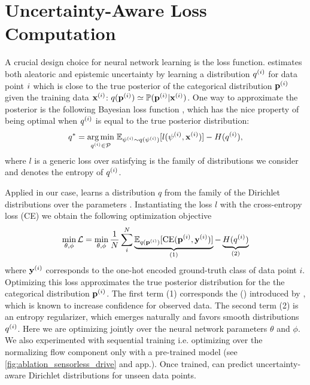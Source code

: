 \section{Uncertainty-Aware Loss Computation}
\label{sec:uncertainty_loss_006}

A crucial design choice for neural network learning is the loss function. \PostNetacro estimates both aleatoric and epistemic uncertainty by learning a distribution $q^{(i)}$ for data point $i$ which is close to the true posterior of the categorical distribution $\mathbf{p}^{(i)}$ given the training data $\mathbf{x}^{(i)}$:
    $q(\mathbf{p}^{(i)}) \simeq \mathbb{P}(\mathbf{p}^{(i)} | \mathbf{x}^{(i)})$.
One way to approximate the posterior is the following Bayesian loss function \cite{update-belief-propagation,PAC-bayesian_estimator,opt_info_processing_bayes}, which has the nice property of being optimal when $q^{(i)}$ is equal to the true posterior distribution:
\begin{equation}
\label{general_bayesian_loss}
    q^* = \underset{q^{(i)} \in \mathcal{P}}{\arg \min}\; \mathbb{E}_{\psi^{(i)} \sim q(\psi^{(i)})}[l(\psi^{(i)}, \mathbf{x}^{(i)})] - H(q^{(i)}),
\end{equation}
where $l$ is a generic loss over \smash{$\psi\dataix$} satisfying  is the family of distributions we consider and  denotes the entropy of $q^{(i)}$.

Applied in our case, \PostNet learns a distribution $q$ from the family of the Dirichlet distributions  over the parameters . Instantiating the loss $l$ with the cross-entropy loss (CE) we obtain the following optimization objective
\begin{equation}
\label{dirichlet_bayesian_loss}
       \min_{\theta,\phi} \mathcal{L} = \min_{\theta, \phi} \frac{1}{N} \sum_{i}^{N} \underbrace{\mathbb{E}_{q(\mathbf{p}^{(i)})}[\text{CE}(\mathbf{p}^{(i)}, \mathbf{y}^{(i)})]}_{\text{(1)}} - \underbrace{H(q^{(i)})}_{\text{(2)}}
\end{equation}
where $\mathbf{y}^{(i)}$ corresponds to the one-hot encoded ground-truth class of data point $i$.
Optimizing this loss approximates the true posterior distribution for the the categorical distribution $\mathbf{p}^{(i)}$. The first term (1) corresponds the \UCE (\UCEacro) introduced by \cite{uceloss}, which is known to increase confidence for observed data. The second term (2) is an entropy regularizer, which emerges naturally and favors smooth distributions $q^{(i)}$. Here we are optimizing jointly over the neural network parameters $\theta$ and $\phi$. We also experimented with sequential training i.e. optimizing over the normalizing flow component only with a pre-trained model (see \cref{fig:ablation_sensorless_drive} and app.). Once trained, \PostNetacro can predict uncertainty-aware Dirichlet distributions for unseen data points.

